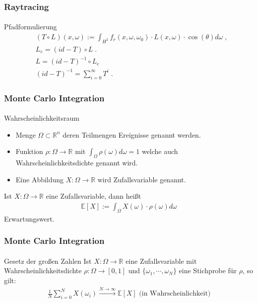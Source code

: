 \documentclass{beamer}
\begin{document}
\begin{frame}
    \frametitle{Raytracing}
\framesubtitle{}
\begin{block}{Pfadformulierung}
\begin{align*}
&(T \circ  L)(x, \omega) :=  \displaystyle \int_{H^2}f_r (x, \omega, \omega_0) \cdot L(x, \omega)  \cdot  \cos(\theta) d\omega \; , \\
&L_e = (id - T) \circ L \; . \\
&L = (id - T)^{-1} \circ L_e  \\
&(id - T)^{-1}= \sum_{i= 0}^{\infty} T^i  \; .
\end{align*}

\end{block}
\end{frame}

\begin{frame}
    \frametitle{Monte Carlo Integration}
\framesubtitle{}
\begin{block}{Wahrscheinlichkeitsraum}
\begin{itemize}
\item  Menge $\Omega \subset \mathbb{R}^n$ deren Teilmengen Ereignisse genannt werden.
\item Funktion $\rho : \Omega \to \mathbb{R}$ mit $\int_{\Omega} \rho(\omega) d\omega = 1$ welche auch Wahrscheinlichkeitsdichte genannt wird.
\item Eine Abbildung $X: \Omega \to \mathbb{R}$ wird Zufallsvariable genannt.
\end{itemize}

Ist $X: \Omega \to \mathbb{R}$ eine  Zufallsvariable, dann heißt
\begin{align}
\mathbb{E}[X] := \int_{\Omega} X(\omega) \cdot \rho(\omega) d\omega 
\end{align}
Erwartungswert.
\end{block}
\end{frame}

\begin{frame}
    \frametitle{Monte Carlo Integration}
\framesubtitle{}
\begin{block}{Gesetz der großen Zahlen}
Ist $X: \Omega \to \mathbb{R}$ eine  Zufallsvariable mit Wahrscheinlichkeitsdichte $\rho: \Omega \to [0,1]$ und $\{ \omega_1, \cdots, \omega_N \}$ eine Stichprobe für $\rho$, so gilt:
\begin{align}
\frac{1}{N} \sum_{i= 0}^{N} X(\omega_i) \xrightarrow{ N \to \infty } \mathbb{E}[X] \text{ (in Wahrscheinlichkeit)}
\end{align}
\end{block}
\end{frame}
\end{document}
